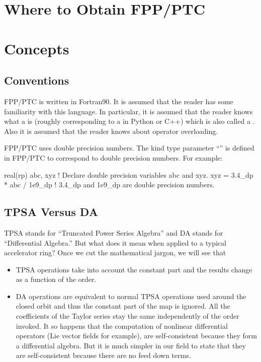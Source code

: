 \documentclass{hitec}     %
\newcommand{\Section}[1]{\section{#1}\vspace*{-1ex}}
\begin{document}
\Section{Where to Obtain FPP/PTC}
\label{s:obtain}

\Section{Concepts}
\label{s:concepts}

\subsection{Conventions}
\label{s:conventions}

FPP/PTC is written in Fortran90. It is assumed that the reader has some familiarity with this language. In particular, it is assumed that the reader knows what a  is (roughly corresponding to a  in Python or C++) which is also called a . Also it is assumed that the reader knows about operator overloading.

FPP/PTC uses double precision numbers. The kind type parameter ``'' is defined in FPP/PTC to correspond to double precision numbers. For example:
\begin{code}
  real(rp) abc, xyz             ! Declare double precision variables abc and xyz.
  xyz = 3.4_dp * abc / 1e9_dp   ! 3.4_dp and 1e9_dp are double precision numbers.
\end{code}

\subsection{TPSA Versus DA}
\label{s:tpsa}

TPSA stands for ``Truncated Power Series Algebra'' and DA stands for ``Differential Algebra.'' But what does it mean when applied to a typical accelerator ring? Once we cut the mathematical jargon, we will see that 

\begin{itemize}
\item TPSA operations take into account the constant part and the results change as a function of the order. 
\item DA operations are equivalent to normal TPSA operations used around the closed orbit and thus the constant part of the map is ignored. All the coefficients of the Taylor series stay the same independently of the order invoked. It so happens that the computation of nonlinear differential operators (Lie vector fields for example), are self-consistent because they form a differential algebra. But it is much simpler in our field to state that they are self-consistent because there are no feed down terms.
\end{itemize}
\end{document}
